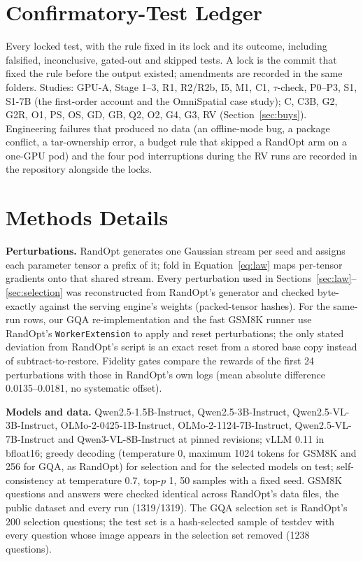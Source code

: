 \documentclass{article}
\begin{document}



\appendix
\onecolumn

\section{Confirmatory-Test Ledger}\label{app:ledger}
Every locked test, with the rule fixed in its lock and its outcome, including falsified, inconclusive, gated-out and
skipped tests. A lock is the commit that fixed the rule before the output existed; amendments are recorded in the same
folders. Studies: GPU-A, Stage 1--3, R1, R2/R2b, I5, M1, C1, $\tau$-check, P0--P3, S1, S1-7B (the first-order account
and the OmniSpatial case study); C, C3B, G2, G2R, O1, PS, OS, GD, GB, Q2, O2, G4, G3, RV (Section~\ref{sec:buys}).
Engineering failures that produced no data (an offline-mode bug, a package conflict, a tar-ownership error, a budget rule
that skipped a RandOpt arm on a one-GPU pod) and the four pod interruptions during the RV runs are recorded in the
repository alongside the locks.
{\scriptsize\setlength{\tabcolsep}{3pt}}

\section{Methods Details}\label{app:methods}
\textbf{Perturbations.} RandOpt generates one Gaussian stream per seed and assigns each parameter tensor a prefix of it;
$\mathrm{fold}$ in Equation~\ref{eq:law} maps per-tensor gradients onto that shared stream. Every perturbation used in
Sections~\ref{sec:law}--\ref{sec:selection} was reconstructed from RandOpt's generator and checked byte-exactly against
the serving engine's weights (packed-tensor hashes). For the same-run rows, our GQA re-implementation and the fast
GSM8K runner use RandOpt's \texttt{WorkerExtension} to apply and reset perturbations; the only stated deviation from
RandOpt's script is an exact reset from a stored base copy instead of subtract-to-restore. Fidelity gates compare the
rewards of the first 24 perturbations with those in RandOpt's own logs (mean absolute difference 0.0135--0.0181, no
systematic offset).

\textbf{Models and data.} Qwen2.5-1.5B-Instruct, Qwen2.5-3B-Instruct, Qwen2.5-VL-3B-Instruct, OLMo-2-0425-1B-Instruct,
OLMo-2-1124-7B-Instruct, Qwen2.5-VL-7B-Instruct and Qwen3-VL-8B-Instruct at pinned revisions; vLLM 0.11 in bfloat16;
greedy decoding (temperature 0, maximum 1024 tokens for GSM8K and 256 for GQA, as RandOpt) for selection and for the
selected models on test; self-consistency at temperature 0.7, top-$p$ 1, 50 samples with a fixed seed. GSM8K questions
and answers were checked identical across RandOpt's data files, the public dataset and every run (1319/1319). The GQA
selection set is RandOpt's 200 selection questions; the test set is a hash-selected sample of testdev with every
question whose image appears in the selection set removed (1238 questions).
\end{document}

